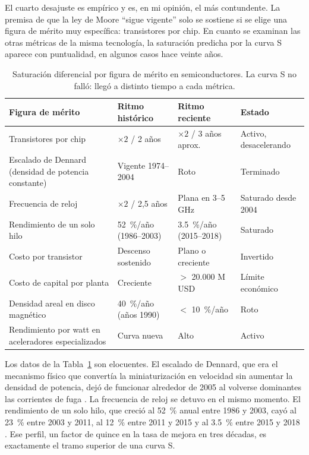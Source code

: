 \documentclass[11pt,letterpaper]{article}
\begin{document}
El cuarto desajuste es empírico y es, en mi opinión, el más contundente. La
premisa de que la ley de Moore \enquote{sigue vigente} solo se sostiene si se
elige una figura de mérito muy específica: transistores por chip. En cuanto se
examinan las otras métricas de la misma tecnología, la saturación predicha por la
curva S aparece con puntualidad, en algunos casos hace veinte años.

\begin{table}[ht]
  \centering
  \small
  \caption{Saturación diferencial por figura de mérito en semiconductores. La
  curva S no falló: llegó a distinto tiempo a cada métrica.}
  \label{tab:saturacion}
  \begin{tabularx}{\textwidth}{@{}>{\raggedright\arraybackslash}X l l l@{}}
    \toprule
    \textbf{Figura de mérito} & \textbf{Ritmo histórico} &
    \textbf{Ritmo reciente} & \textbf{Estado} \\
    \midrule
    Transistores por chip
      & $\times 2$ / 2 años & $\times 2$ / 3 años aprox. & Activo, desacelerando \\
    Escalado de Dennard (densidad de potencia constante)
      & Vigente 1974--2004 & Roto & Terminado \\
    Frecuencia de reloj
      & $\times 2$ / 2,5 años & Plana en 3--5 GHz & Saturado desde 2004 \\
    Rendimiento de un solo hilo
      & \SI{52}{\percent}/año (1986--2003) & \SI{3.5}{\percent}/año (2015--2018)
      & Saturado \\
    Costo por transistor
      & Descenso sostenido & Plano o creciente & Invertido \\
    Costo de capital por planta
      & Creciente & $>$ 20.000 M USD & Límite económico \\
    Densidad areal en disco magnético
      & \SI{40}{\percent}/año (años 1990) & $<$ \SI{10}{\percent}/año & Roto \\
    Rendimiento por watt en aceleradores especializados
      & Curva nueva & Alto & Activo \\
    \bottomrule
  \end{tabularx}
\end{table}

Los datos de la Tabla~\ref{tab:saturacion} son elocuentes. El escalado de
Dennard, que era el mecanismo físico que convertía la miniaturización en
velocidad sin aumentar la densidad de potencia, dejó de funcionar alrededor de
2005 al volverse dominantes las corrientes de fuga \parencite{dennard1974}. La
frecuencia de reloj se detuvo en el mismo momento. El rendimiento de un solo
hilo, que creció al \SI{52}{\percent} anual entre 1986 y 2003, cayó al
\SI{23}{\percent} entre 2003 y 2011, al \SI{12}{\percent} entre 2011 y 2015 y al
\SI{3.5}{\percent} entre 2015 y 2018 \parencite{hennessy2019}. Ese perfil, un
factor de quince en la tasa de mejora en tres décadas, es exactamente el tramo
superior de una curva S.
\end{document}
